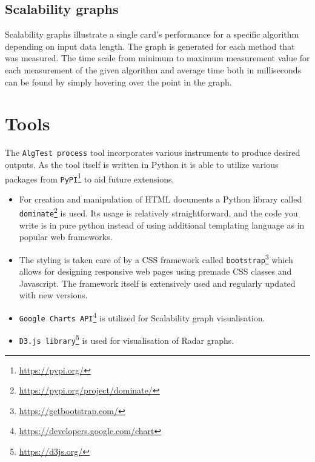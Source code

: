 
\subsection{Scalability graphs}
Scalability graphs illustrate a single card's performance for a specific algorithm depending on input data length. The graph is generated for each method that was measured. The time scale from minimum to maximum measurement value for each measurement of the given algorithm and average time both in milliseconds can be found by simply hovering over the point in the graph.





\section{Tools}
The \texttt{AlgTest process} tool incorporates various instruments to produce desired outputs. As the tool itself is written in Python it is able to utilize various packages from \texttt{PyPI}\footnote{\url{https://pypi.org/}} to aid future extensions.

\begin{itemize}
    \item For creation and manipulation of HTML documents a Python library called \texttt{dominate}\footnote{\url{https://pypi.org/project/dominate/}} is used. Its usage is relatively straightforward, and the code you write is in pure python instead of using additional templating language as in popular web frameworks.
    \item The styling is taken care of by a CSS framework called \texttt{bootstrap}\footnote{\url{https://getbootstrap.com/}} which allows for designing responsive web pages using premade CSS classes and Javascript. The framework itself is extensively used and regularly updated with new versions.
    \item \texttt{Google Charts API}\footnote{\url{https://developers.google.com/chart}}  is utilized for Scalability graph visualisation.
    \item \texttt{D3.js library}\footnote{\url{https://d3js.org/}}  is used for visualisation of Radar graphs.
\end{itemize}

